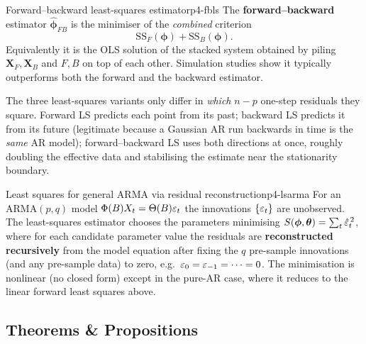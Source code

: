 \begin{definition}{Forward--backward least-squares estimator}{p4-fbls}
The \textbf{forward--backward} estimator $\hat{\boldsymbol\phi}_{FB}$ is the
minimiser of the \emph{combined} criterion
\[
\mathrm{SS}_F(\boldsymbol\phi)+\mathrm{SS}_B(\boldsymbol\phi).
\]
Equivalently it is the OLS solution of the stacked system obtained by piling
$\mathbf X_F,\mathbf X_B$ and $F,B$ on top of each other. Simulation studies
show it typically outperforms both the forward and the backward estimator.
\end{definition}

\begin{intuition}
The three least-squares variants only differ in \emph{which} $n-p$ one-step
residuals they square. Forward LS predicts each point from its past; backward
LS predicts it from its future (legitimate because a Gaussian AR run backwards
in time is the \emph{same} AR model); forward--backward LS uses both directions
at once, roughly doubling the effective data and stabilising the estimate near
the stationarity boundary.
\end{intuition}

\begin{definition}{Least squares for general ARMA via residual reconstruction}{p4-lsarma}
For an ARMA$(p,q)$ model $\Phi(B)X_t=\Theta(B)\varepsilon_t$ the innovations
$\{\varepsilon_t\}$ are unobserved. The least-squares estimator chooses the parameters
minimising $S(\boldsymbol\phi,\boldsymbol\theta)=\sum_t\hat{\varepsilon}_t^{\,2}$, where
for each candidate parameter value the residuals are \textbf{reconstructed
recursively} from the model equation after fixing the $q$ pre-sample
innovations (and any pre-sample data) to zero, e.g.\
$\varepsilon_0=\varepsilon_{-1}=\cdots=0$. The minimisation is nonlinear (no closed form)
except in the pure-AR case, where it reduces to the linear forward least squares
above.
\end{definition}

\subsection{Theorems \& Propositions}

